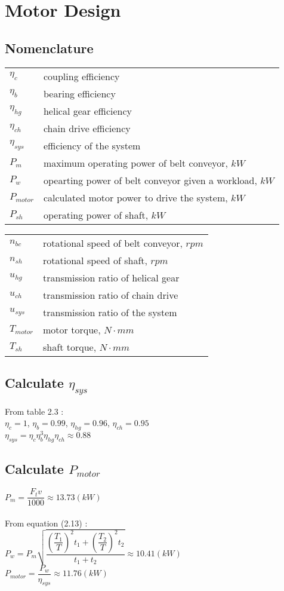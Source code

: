 \chapter{Motor Design}
\section{Nomenclature}
\begin{tabular}[t]{lp{7cm}}
	$ \eta_c $ & coupling efficiency\\
	$ \eta_b $ & bearing efficiency\\
	$ \eta_{hg} $ & helical gear efficiency\\
	$ \eta_{ch} $ & chain drive efficiency\\
	$ \eta_{sys} $ & efficiency of the system\\
	$ P_m $ & maximum operating power of belt conveyor, $ \unit{kW} $\\
	$ P_w $ & opearting power of belt conveyor given a workload, $ \unit{kW} $\\
	$ P_{motor} $ & calculated motor power to drive the system, $ \unit{kW} $\\
	$ P_{sh} $ & operating power of shaft, $ \unit{kW} $\\
\end{tabular}
\begin{tabular}[t]{lp{7cm}}
	$ n_{bc} $ & rotational speed of belt conveyor, $ \unit{rpm} $\\
	$ n_{sh} $ & rotational speed of shaft, $ \unit{rpm} $\\
	$ u_{hg} $ & transmission ratio of helical gear\\
	$ u_{ch} $ & transmission ratio of chain drive\\
	$ u_{sys} $ & transmission ratio of the system\\
	$ T_{motor} $ & motor torque, $ \unit{N\cdot mm} $\\
	$ T_{sh} $ & shaft torque, $ \unit{N\cdot mm} $
\end{tabular}
\section{Calculate $ \eta_{sys} $}
From table 2.3 :\\
$ \eta_c = 1 $, $ \eta_b = 0.99 $, $ \eta_{hg} = 0.96 $, $ \eta_{ch} = 0.95 $\\
$ \eta_{sys} = \eta_c\eta_b^3\eta_{hg}\eta_{ch} \approx 0.88 $
\section{Calculate $ P_{motor} $}
$ P_m = \dfrac{F_tv}{1000} \approx 13.73 \unit{(kW)}$\\\\
From equation (2.13) :\\
$ P_w = P_m\sqrt{\dfrac{\left(\dfrac{T_1}{T}\right)^2t_1 + \left(\dfrac{T_2}{T}\right)^2t_2}{t_1+t_2}} \approx 10.41 \unit{(kW)} $\\
$ P_{motor} = \dfrac{P_w}{\eta_{sys}} \approx 11.76\unit{(kW)}$
